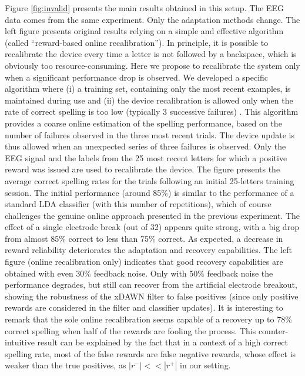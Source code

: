 \documentclass[conference]{IEEEtran}
\begin{document}
Figure \ref{fig:invalid} presents the main results obtained in this setup. The EEG data comes from the same experiment. 
Only the adaptation methods change. 
The left figure presents original results relying on a simple and effective algorithm (called ``reward-based online recalibration'').
In principle, it is possible to recalibrate the device every time a letter is not followed by a backspace, 
which is obviously too resource-consuming. Here we propose to recalibrate the system only when a significant performance drop is observed.
We developed a specific algorithm where (i) a training set, containing only the most recent examples, is maintained during use and 
(ii) the device recalibration is allowed only when the rate of correct spelling is too low (typically 3 successive failures) \cite{Dauce13}.
This algorithm provides a coarse online estimation of the spelling performance, based on the number of failures observed in the three
most recent trials. 
The device update is thus allowed when an unexpected series of three failures is observed.
Only the EEG signal and the labels from the 25 most recent letters for which a positive reward was issued are used to recalibrate the device.   
The figure presents the average correct spelling rates for the trials
following an initial 25-letters training session. The initial performance (around 85\%) is similar to 
the performance of a standard LDA classifier (with this number of repetitions), which of course challenges the genuine online approach
presented in the previous experiment.
The effect of 
a single electrode break (out of 32) appears quite strong, with a big drop from almost 85\% correct to less than
75\% correct.
As expected, a decrease in reward reliability deteriorates the adaptation
and recovery capabilities.
The left figure (online recalibration only) indicates that good recovery capabilities are obtained 
with even 30\% feedback noise.
Only with 50\% feedback noise the performance degrades, but still can recover from the artificial electrode breakout,
showing the robustness of the xDAWN filter to false positives (since only positive rewards are
considered in the filter and classifier updates). It is interesting to remark that the sole online recalibration  
seems capable of a recovery up to 78\% correct spelling when half of the rewards are fooling the process. 
This counter-intuitive result can be explained by the fact that in a context of a high correct spelling rate,
most of the false rewards are false negative rewards, whose effect is weaker than the true positives,
as $|r^-|<<|r^+|$ in our setting.
\end{document}
